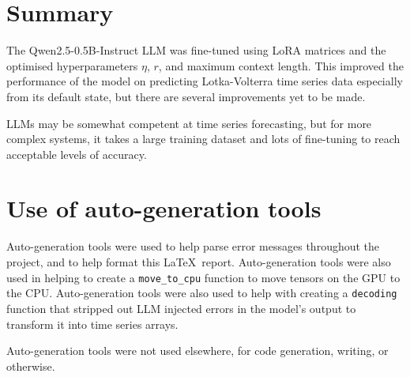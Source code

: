 \documentclass[11pt,a4paper]{article}
\begin{document}
\section{Summary}
The Qwen2.5-0.5B-Instruct LLM was fine-tuned using LoRA matrices and the optimised hyperparameters $\eta$, $r$, and maximum context length. This improved the performance of the model on predicting Lotka-Volterra time series data especially from its default state, but there are several improvements yet to be made.

LLMs may be somewhat competent at time series forecasting, but for more complex systems, it takes a large training dataset and lots of fine-tuning to reach acceptable levels of accuracy.
\clearpage


\appendix
\section{Use of auto-generation tools}
Auto-generation tools were used to help parse error messages throughout the project, and to help format this \LaTeX\ report. Auto-generation tools were also used in helping to create a \texttt{move\_to\_cpu} function to move tensors on the GPU to the CPU. Auto-generation tools were also used to help with creating a \texttt{decoding} function that stripped out LLM injected errors in the model's output to transform it into time series arrays.

Auto-generation tools were not used elsewhere, for code generation, writing, or otherwise.
\end{document}

